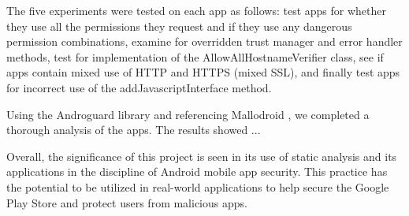 The five experiments were tested on each app as follows: test apps for whether they use all the permissions they request and if they use any dangerous permission combinations, examine for overridden trust manager and error handler methods, 
test for implementation of the AllowAllHostnameVerifier class, see if apps contain mixed use of HTTP and HTTPS (mixed SSL), and finally test apps for incorrect use of the addJavascriptInterface method.

Using the Androguard library \cite{androguard} and referencing Mallodroid \cite{10.1145/2382196.2382205}, we completed a thorough analysis of the apps. The results showed ... %

Overall, the significance of this project is seen in its use of static analysis and its applications in the discipline of Android mobile app security. This practice has the potential to be utilized in real-world applications to help secure the Google Play Store and protect users from malicious apps. 
